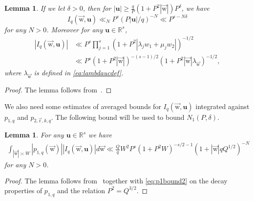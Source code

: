 \documentclass[letterpaper,11pt]{amsart}
\numberwithin{equation}{section}
\newtheorem{lemma}[theorem]{Lemma}
\theoremstyle{definition}
\numberwithin{equation}{section}
\newcommand{\uu}{\mathbf{u}}
\newcommand{\ur}{\vec{\mathrm{r}}}
\newcommand{\uw}{{\vec{\mathrm{w}}}}
\newcommand{\R}{\mathbb{R}}
\begin{document}
 \begin{lemma}\label{lem:IQ}
 If we let 
  $\delta>0$, then for $|\uu|\geq \frac{q}{P}(1+P^2|\uw|)P^\delta$, we have 
 \[I_q(\uw,\uu)\ll_N P^s(P|\uu|/q)^{-N}\ll P^{s-N\delta}\]
 for any $N>0$. 
 Moreover for  any $\uu\in\R^s$,
\begin{align*}|I_q(\uw,\uu)|&\ll P^s\prod_{j=1}^s(1+P^2|\lambda_j w_1+\mu_j w_2|)^{-1/2}\\ &\ll P^s(1+P^2|\uw| )^{-(s-1)/2}(1+P^2|\uw|\lambda_\uw)^{-1/2},\end{align*}
where $\lambda_\uw$ is defined in \eqref{eq:lambdaucdef}.
 \end{lemma}
 \begin{proof}
The lemma follows from~\cite[Lemma 3.1, Lemma 2.3]{HBP}.
 \end{proof}
 

 We also need some estimates of averaged bounds for $I_q(\uw, \uu)$ integrated against $p_{1,q}$ and $p_{2,\ur,k,q}$. The following bound will be used to bound $N_1(P,\delta)$.
	\begin{lemma}\label{p2integral}
		For any $\uu\in \R^s$ we have 
			\begin{align*}
				\int _{|\uw |\asymp W} 
			|	p_{1, q}(\uw)||I_q(\uw, \uu)|d\uw\ll \frac{Q}{q}W^2P^{s}(1+P^2W)^{-s/2-1}(1+|\uw| qQ^{1/2})^{-N}
			\end{align*}
			for any $N>0$. 	\end{lemma}
	\begin{proof}
	The lemma follows from~\cite[Lemma 3.3]{HBP} together with \eqref{eq:p1bound2} on the decay properties of $p_{1,q}$ and the relation $P^2=Q^{3/2}$.  
		\end{proof}
\end{document}
